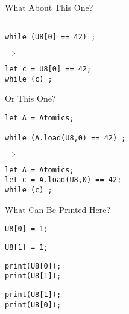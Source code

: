 \documentclass[notes]{beamer}
\begin{document}
\begin{frame}[fragile]{What About This One?}
  \begin{minipage}{.45\textwidth}
    \begin{lstlisting}

while (U8[0] == 42) ;
    \end{lstlisting}
  \end{minipage}%
  \hfill$\Rightarrow$\hfill
  \begin{minipage}{.45\textwidth}
    \begin{lstlisting}
let c = U8[0] == 42;
while (c) ;
    \end{lstlisting}
  \end{minipage}
\end{frame}

\begin{frame}[fragile]{Or This One?}
  \begin{minipage}{.45\textwidth}
    \begin{lstlisting}
let A = Atomics;

while (A.load(U8,0) == 42) ;
    \end{lstlisting}
  \end{minipage}%
  \hfill$\Rightarrow$\hfill
  \begin{minipage}{.45\textwidth}
    \begin{lstlisting}
let A = Atomics;
let c = A.load(U8,0) == 42;
while (c) ;
    \end{lstlisting}
  \end{minipage}
\end{frame}

\begin{frame}[fragile]{What Can Be Printed Here?}
  \begin{minipage}{0.2\textwidth}
  \begin{lstlisting}
U8[0] = 1;

  \end{lstlisting}
  \end{minipage}%
  \vrule\hspace{1pt}\vrule
  \begin{minipage}{0.2\textwidth}
  \begin{lstlisting}
U8[1] = 1;

  \end{lstlisting}
  \end{minipage}%
    \vrule\hspace{1pt}\vrule
  \begin{minipage}{0.25\textwidth}
  \begin{lstlisting}
print(U8[0]);
print(U8[1]);
  \end{lstlisting}
  \end{minipage}%
    \vrule\hspace{1pt}\vrule
  \begin{minipage}{0.25\textwidth}
  \begin{lstlisting}
print(U8[1]);
print(U8[0]);
  \end{lstlisting}
  \end{minipage}
\end{frame}
\end{document}
